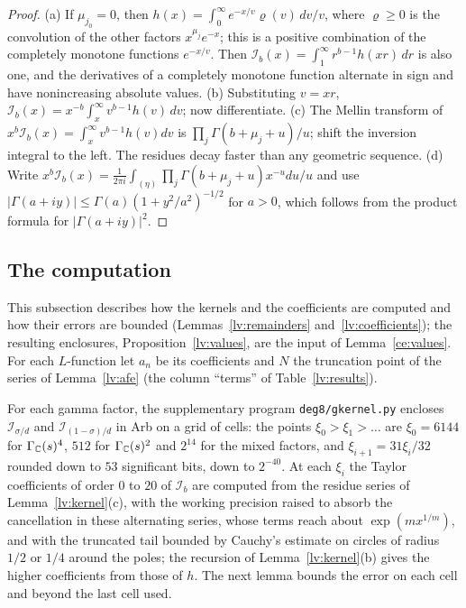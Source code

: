 \begin{proof}
(a) If $\mu_{j_0}=0$, then $h(x)=\int_0^\infty e^{-x/v}\varrho(v)\,dv/v$, where
$\varrho\ge0$ is the convolution of the other factors $x^{\mu_j}e^{-x}$; this
is a positive combination of the completely monotone functions $e^{-x/v}$.
Then $\mathcal I_b(x)=\int_1^\infty r^{b-1}h(xr)\,dr$ is also one, and the
derivatives of a completely monotone function alternate in sign and have
nonincreasing absolute values.
(b) Substituting $v=xr$, $\mathcal I_b(x)=x^{-b}\int_x^\infty v^{b-1}h(v)\,dv$;
now differentiate.
(c) The Mellin transform of $x^b\mathcal I_b(x)=\int_x^\infty v^{b-1}h(v)dv$ is
$\prod_j\Gamma(b+\mu_j+u)/u$; shift the inversion integral to the left. The
residues decay faster than any geometric sequence.
(d) Write $x^b\mathcal I_b(x)=\frac1{2\pi i}\int_{(\eta)}\prod_j
\Gamma(b+\mu_j+u)x^{-u}du/u$ and use
$|\Gamma(a+iy)|\le\Gamma(a)(1+y^2/a^2)^{-1/2}$ for $a>0$, which follows from
the product formula for $|\Gamma(a+iy)|^2$.
\end{proof}

\subsection{The computation}\label{lv:computation}
This subsection describes how the kernels and the coefficients are computed
and how their errors are bounded (Lemmas~\ref{lv:remainders}
and~\ref{lv:coefficients}); the resulting enclosures,
Proposition~\ref{lv:values}, are the input of Lemma~\ref{ce:values}. For each
$L$-function let $a_n$ be its coefficients and $N$ the truncation point of
the series of Lemma~\ref{lv:afe} (the column ``terms'' of
Table~\ref{lv:results}).

For each gamma factor, the supplementary program \texttt{deg8/gkernel.py}
encloses $\mathcal I_{\sigma/d}$ and $\mathcal I_{(1-\sigma)/d}$ in Arb on a
grid of cells: the points $\xi_0>\xi_1>\dots$ are $\xi_0=6144$ for
$\Gamma_\mathbb C(s)^4$, $512$ for $\Gamma_\mathbb C(s)^2$ and $2^{14}$ for the mixed
factors, and $\xi_{i+1}=31\xi_i/32$ rounded down to $53$ significant bits, down to
$2^{-40}$. At each $\xi_i$ the Taylor coefficients of order $0$ to $20$ of
$\mathcal I_b$ are computed from the residue series of
Lemma~\ref{lv:kernel}(c), with the working precision raised to absorb the
cancellation in these alternating series, whose terms reach about
$\exp(m x^{1/m})$, and with the truncated tail bounded by Cauchy's estimate on
circles of radius $1/2$ or $1/4$ around the poles; the recursion of
Lemma~\ref{lv:kernel}(b) gives the higher coefficients from those of $h$. The
next lemma bounds the error on each cell and beyond the last cell used.

